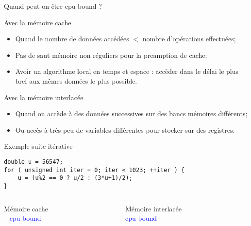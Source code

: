 \documentclass[handout,francais]{beamer}
\begin{document}
\begin{frame}[fragile]{Quand peut-on être cpu bound ?}
 
  \begin{block}{Avec la mémoire cache}
 \begin{itemize}
  \item Quand le nombre de données accédées $<$ nombre d'opérations effectuées;
  \item Pas de saut mémoire non réguliers pour la preamption de cache;
  \item Avoir un algorithme local en temps et espace : accèder dans le délai le plus bref aux mêmes données
  le plus possible.
 \end{itemize}
 \end{block}
 
 \begin{block}{Avec la mémoire interlacée}
  \begin{itemize}
   \item Quand on accède à des données successives sur des bancs mémoires différents;
   \item Ou accès à très peu de variables différentes pour stocker sur des registres.
  \end{itemize}

 \end{block}

\end{frame}

\begin{frame}[fragile]{Exemple suite itérative}
 \begin{lstlisting}
double u = 56547;
for ( unsigned int iter = 0; iter < 1023; ++iter ) {
    u = (u%2 == 0 ? u/2 : (3*u+1)/2);
}
 \end{lstlisting}

 \begin{columns}[t]
  \begin{column}{0.5\textwidth}
   \textcolor{green!25!black}{Mémoire cache} 
   \\ 
   \textcolor{blue}{cpu bound}
   \end{column}
   \begin{column}{0.5\textwidth}
   \textcolor{orange!25!black}{Mémoire interlacée}
   \\
   \textcolor{blue}{cpu bound}
  \end{column}

 \end{columns}
 
\end{frame}
\end{document}
